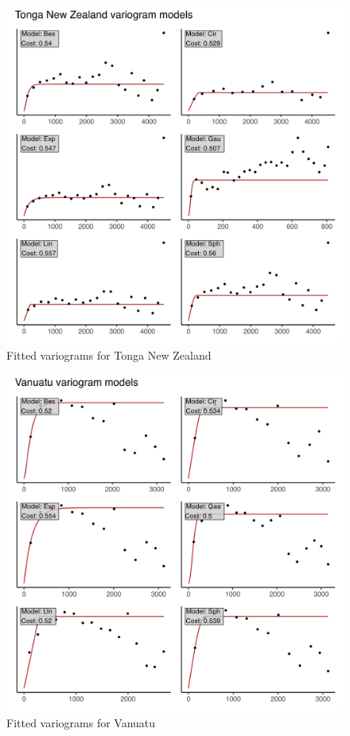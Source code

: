 \begin{figure}
\centering
\includegraphics{assets/figs/chpt3/TongaNewZealandVgrms.png}
\caption[Fitted variograms for Tonga New Zealand]{Fitted variograms for Tonga New Zealand}
\end{figure}

\begin{figure}
\centering
\includegraphics{assets/figs/chpt3/VanuatuVgrms.png}
\caption[Fitted variograms for Vanuatu]{Fitted variograms for Vanuatu}
\end{figure}

